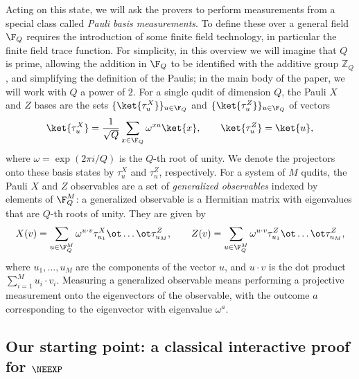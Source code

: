 \documentclass[11pt]{article}
\begin{document}
Acting on this state, we will ask the provers to perform measurements
from a special class called \emph{Pauli basis measurements}. To define
these over a general field $\F_Q$ requires the introduction of some
finite field technology, in particular the finite field trace
function. For simplicity, in this overview we will imagine that $Q$ is
prime, allowing the addition in $\F_Q$ to be identified with the
additive group $\mathbb{Z}_Q$, and simplifying the definition of the
Paulis; in the main body of the paper, we will work with $Q$ a power
of $2$. For a single qudit of dimension $Q$, the Pauli $X$ and $Z$
bases are the sets $\{\ket{\tau^X_u}\}_{u \in \F_Q}$ and $\{\ket{\tau^Z_u}\}_{u
  \in \F_Q}$ of vectors
\[ \ket{\tau^X_u} = \frac{1}{\sqrt{Q}}\sum_{x \in \F_Q}  \omega^{x u} \ket{x}, \qquad
  \ket{\tau^Z_u} = \ket{u}, \]
where $\omega = \exp(2\pi i/Q)$ is the $Q$-th root of unity. We denote
the projectors onto these basis states by $\tau^X_u$ and $\tau^Z_u$,
respectively. For a system of $M$ qudits, the Pauli
$X$ and $Z$ observables are a set of \emph{generalized observables}
indexed by elements of $\F_Q^M$: a generalized observable is a
Hermitian matrix with eigenvalues that are $Q$-th roots of unity.
They are given by
\[ X(v) =\sum_{u \in \F_Q^M} \omega^{u \cdot v} \tau^X_{u_1} \ot \dots
  \ot \tau^Z_{u_M}, 
  \qquad Z(v) = \sum_{u \in \F_Q^M} \omega^{u \cdot v} \tau^Z_{u_1}
  \ot \dots \ot \tau^Z_{u_M},\]
where $u_1, \dots, u_M$ are the components of the vector $u$, and
$u\cdot v$ is the dot product $\sum_{i=1}^{M} u_i \cdot
v_i$. Measuring a generalized observable means performing a projective
measurement onto the eigenvectors of the observable, with the
outcome $a$ corresponding to the eigenvector with eigenvalue
$\omega^{a}$. 



\subsection{Our starting point: a classical interactive proof for
  $\NEEXP$}
\end{document}
